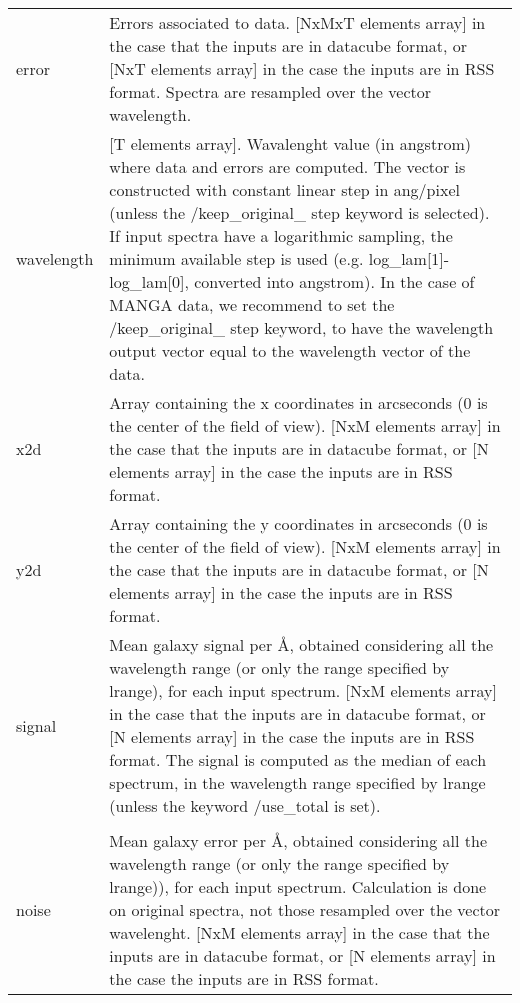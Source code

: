 \begin{center}
\begin{longtable}{p{2.7cm}| p{11.1cm}}
%
error          & Errors associated to data. [NxMxT elements array] in the case that the inputs are in datacube format, or [NxT elements array]
               in the case the inputs are in RSS format. Spectra are resampled over the vector wavelength. \\
%
wavelength     & [T elements array]. Wavalenght value (in angstrom)  where data and errors are computed. The vector is constructed with constant 
               linear step in ang/pixel 
               (unless the /keep\_original\_ step keyword is selected). If input spectra have a logarithmic sampling, 
               the minimum available step is used (e.g. log\_lam[1]-log\_lam[0], converted into angstrom).  In the case of MANGA data, 
               we recommend to set the /keep\_original\_ step keyword, to have the wavelength output vector equal to the wavelength vector of the data.\\
%
x2d            & Array containing the x coordinates in arcseconds (0 is the center of the field of view). 
               [NxM elements array] in the case that the inputs are in datacube format, or 
               [N elements array] in the case the inputs are in RSS format. \\
%
y2d            & Array containing the y coordinates in arcseconds (0 is the center of the field of view). 
               [NxM elements array] in the case that the inputs are in datacube format, or 
               [N elements array] in the case the inputs are in RSS format. \\
%
signal         & Mean galaxy signal per \AA, obtained considering all the wavelength range 
               (or only the range specified by lrange), for each input spectrum.               
               [NxM elements array] in the case that the inputs are in datacube format, or 
               [N elements array] in the case the inputs are in RSS format. 
               The signal is computed as the median of each spectrum, in the wavelength range specified by lrange (unless the keyword /use\_total is set). \\
\\
%
noise          & Mean galaxy error per \AA, obtained considering all the wavelength range 
               (or only the range specified by lrange)), for each input spectrum. Calculation is done on original spectra, not 
               those resampled over the vector wavelenght.
               [NxM elements array] in the case that the inputs are in datacube format, or 
               [N elements array] in the case the inputs are in RSS format.

\end{longtable}
\end{center}
